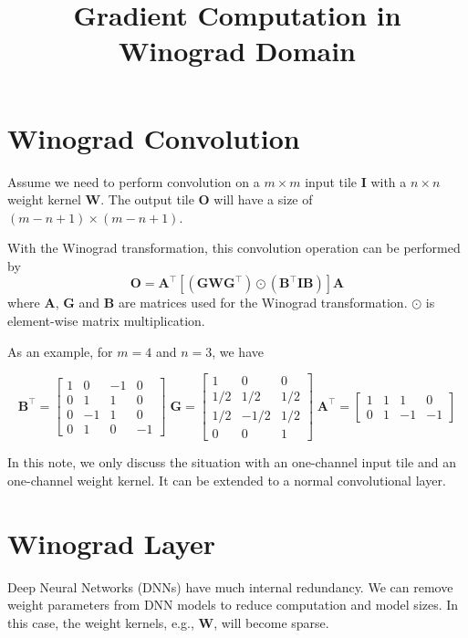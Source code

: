 \documentclass[12pt]{article} %
\title{Gradient Computation in Winograd Domain}
\date{\vspace{-5ex}}
\begin{document}
\maketitle

\section{Winograd Convolution}
Assume we need to perform convolution on a $m \times m$ input tile $\boldsymbol{I}$ with a $n \times n$ weight kernel $\boldsymbol{W}$. The output tile $\boldsymbol{O}$ will have a size of $(m - n + 1) \times (m - n + 1)$.

With the Winograd transformation, this convolution operation can be performed by
\begin{equation}
	\boldsymbol{O} = \boldsymbol{A}^{\top} \left [ (\boldsymbol{G} \boldsymbol{W} \boldsymbol{G}^{\top}) \odot (\boldsymbol{B}^{\top} \boldsymbol{I} \boldsymbol{B}) \right ] \boldsymbol{A}
\end{equation}
where $\boldsymbol{A}$, $\boldsymbol{G}$ and $\boldsymbol{B}$ are matrices used for the Winograd transformation. $\odot$ is element-wise matrix multiplication.

As an example, for $m = 4$ and $n = 3$, we have

\begin{equation}
\boldsymbol{B}^{\top}=\left [ \begin{matrix}
 1 & 0 & -1 & 0 \\ 
 0 & 1 & 1 & 0 \\ 
 0 & -1 & 1 & 0 \\ 
 0 & 1 & 0 & -1
\end{matrix} \right ]
\;
\boldsymbol{G}=\left [ \begin{matrix}
 1 & 0 & 0\\ 
 1/2 & 1/2 & 1/2 \\ 
 1/2 & -1/2 & 1/2 \\ 
 0 & 0 & 1 
\end{matrix} \right ]
\;
\boldsymbol{A}^{\top}=\left [ \begin{matrix}
 1 & 1 & 1 & 0 \\ 
 0 & 1 & -1 & -1
\end{matrix} \right ]
\end{equation}

In this note, we only discuss the situation with an one-channel input tile and an one-channel weight kernel. It can be extended to a normal convolutional layer.

\section{Winograd Layer}
Deep Neural Networks (DNNs) have much internal redundancy. We can remove weight parameters from DNN models to reduce computation and model sizes. In this case, the weight kernels, e.g., $\boldsymbol{W}$, will become sparse.
\end{document}
